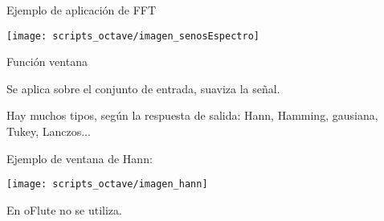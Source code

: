 \begin{frame}{Ejemplo de aplicación de FFT}
  \begin{center}
    \texttt{[image: scripts\_octave/imagen\_senosEspectro]}
  \end{center}
\end{frame}

\begin{frame}{Función ventana}
  \begin{center}
    Se aplica sobre el conjunto de entrada, suaviza la señal.

    \medskip

    Hay muchos tipos, según la respuesta de salida: Hann, Hamming, gausiana, Tukey, Lanczos...

    \medskip

    Ejemplo de ventana de Hann:

    \texttt{[image: scripts\_octave/imagen\_hann]}

    \medskip

    En oFlute no se utiliza.
  \end{center}
\end{frame}

